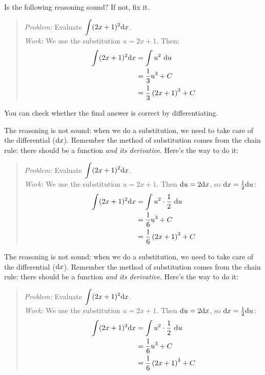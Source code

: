 \begin{Mquestion}
Is the following reasoning sound? If not, fix it.
\begin{quote}
\emph{Problem:} Evaluate $\displaystyle\int (2x+1)^2 \mathrm{d}x$.\\[10pt]
\emph{Work:} We use the substitution $u=2x+1$. Then:
\begin{align*}
\int (2x+1)^2 \mathrm{d}x&=\int u^2\ \mathrm{d}u\\
&=\frac{1}{3}u^3+C\\
&=\frac{1}{3}\left(2x+1\right)^3+C
\end{align*}

\end{quote}
\end{Mquestion}
\begin{hint}
You can check whether the final answer is correct by differentiating.
\end{hint}
\begin{answer}
The reasoning is not sound: when we do a substitution, we need to take care of the differential ($\mathrm{d}x$). Remember the method of substitution comes from the chain rule: there should be a function \emph{and its derivative}. Here's the way to do it:
\begin{quote}
\emph{Problem:} Evaluate $\displaystyle\int (2x+1)^2 \mathrm{d}x$.\\[10pt]
\emph{Work:} We use the substitution $u=2x+1$. Then $\mathrm{d}u=2\mathrm{d}x$, so $\mathrm{d}x = \frac{1}{2}\mathrm{d}u$:
\begin{align*}
\int (2x+1)^2 \mathrm{d}x&=\int u^2\cdot \frac{1}{2}\ \mathrm{d}u\\
&=\frac{1}{6}u^3+C\\
&=\frac{1}{6}\left(2x+1\right)^3+C
\end{align*}
\end{quote}

\end{answer}
\begin{solution}
The reasoning is not sound: when we do a substitution, we need to take care of the differential ($\mathrm{d}x$). Remember the method of substitution comes from the chain rule: there should be a function \emph{and its derivative}. Here's the way to do it:
\begin{quote}
\emph{Problem:} Evaluate $\displaystyle\int (2x+1)^2 \mathrm{d}x$.\\[10pt]
\emph{Work:} We use the substitution $u=2x+1$. Then $\mathrm{d}u=2\mathrm{d}x$, so $\mathrm{d}x = \frac{1}{2}\mathrm{d}u$:
\begin{align*}
\int (2x+1)^2 \mathrm{d}x&=\int u^2\cdot \frac{1}{2}\ \mathrm{d}u\\
&=\frac{1}{6}u^3+C\\
&=\frac{1}{6}\left(2x+1\right)^3+C
\end{align*}
\end{quote}

\end{solution}

